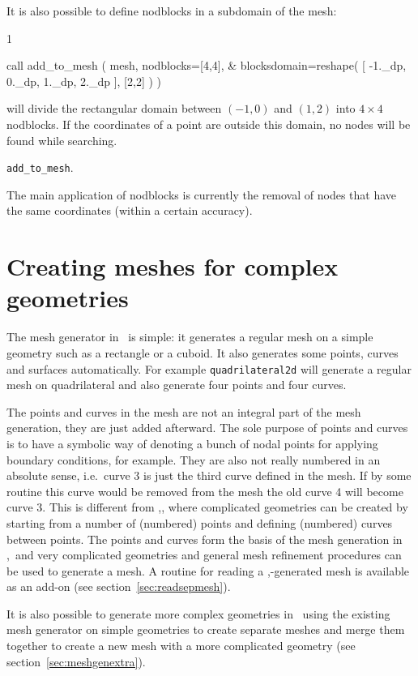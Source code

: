 It is also possible to define nodblocks in a subdomain of the mesh:
\begin{listing}{1}

  call add_to_mesh ( mesh, nodblocks=[4,4], &
    blocksdomain=reshape( [ -1._dp, 0._dp, 1._dp, 2._dp ], [2,2] )  )

\end{listing}
will divide the rectangular domain between $(-1,0)$ and $(1,2)$ into $4\times4$
nodblocks.
If the coordinates of a point are outside this domain, no nodes will
be found while searching.

 \texttt{add\_to\_mesh}.

The main application of nodblocks is currently the removal of nodes that have
the same coordinates (within a certain accuracy).

\section{Creating meshes for complex geometries}
\label{sec:complexmeshes}

The mesh generator in \tfem\ is simple: it generates a regular mesh on a simple
geometry such as a rectangle or a cuboid.
It also generates some points, curves and surfaces
automatically. For example \texttt{quadrilateral2d} will generate a regular
mesh on quadrilateral and also generate four points and four curves.

The points and curves in the mesh are not an integral part of the mesh
generation, they are just added afterward. The sole purpose of points and
curves is to have a symbolic way of denoting a bunch of nodal points for
applying boundary conditions, for example.
They are also not really numbered in an
absolute sense, i.e.\ curve 3 is just the third curve defined in the mesh. If
by some routine this curve would be removed from the mesh the old curve 4 will
become curve 3. This is different from \sep, where complicated geometries can
be created by starting from a number of (numbered) points and
defining (numbered) curves between points.
The points and curves form the basis of the mesh generation in \sep\ and very
complicated geometries and general mesh refinement procedures can be used to
generate a mesh. A routine
for reading a \sep-generated mesh is available as an add-on (see
section~\ref{sec:readsepmesh}).

It is also possible to generate more complex geometries in \tfem\ using the
existing mesh generator on simple geometries to create separate meshes and 
merge them together to create a new mesh with a more complicated geometry (see
section~\ref{sec:meshgenextra}).

